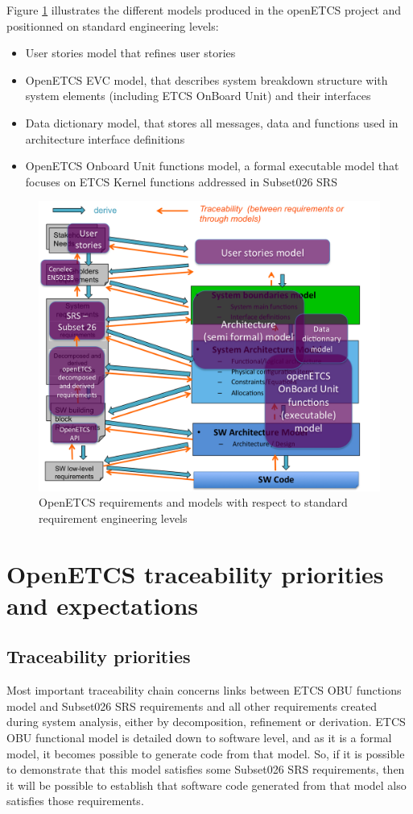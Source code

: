 \documentclass[11pt]{template/openetcs_report}
\begin{document}
Figure \ref{fig:openETCSRequirementsAndModels} illustrates the different models produced in the openETCS project and positionned on standard engineering levels:
\begin{itemize}
\item User stories model that refines user stories 
\item OpenETCS EVC model, that describes system breakdown structure with system elements (including ETCS OnBoard Unit) and their interfaces
\item Data dictionary model, that stores all messages, data and functions used in architecture interface definitions
\item OpenETCS Onboard Unit functions model, a formal executable model that focuses on ETCS Kernel functions addressed in Subset026 SRS
\end{itemize}

 
\begin{figure}[htb]
\centering
\includegraphics[width=.9\linewidth]
{./images/openETCSRequirementsAndModels.png}
\caption{\label{fig:openETCSRequirementsAndModels}OpenETCS requirements and models with respect to standard requirement engineering levels}
\end{figure}

\chapter{OpenETCS traceability priorities and expectations}
\section{Traceability priorities}
\label{sec-3-1} 
Most important traceability chain concerns links between ETCS OBU functions model and Subset026 SRS requirements and all other requirements created during system analysis, either by decomposition, refinement or derivation. 
ETCS OBU functional model is detailed down to software level, and as it is a formal model, it becomes possible to generate code from that model. So, if it is possible to demonstrate that this model satisfies some Subset026 SRS requirements, then it will be possible to establish that software code generated from that model also satisfies those requirements.
\end{document}
